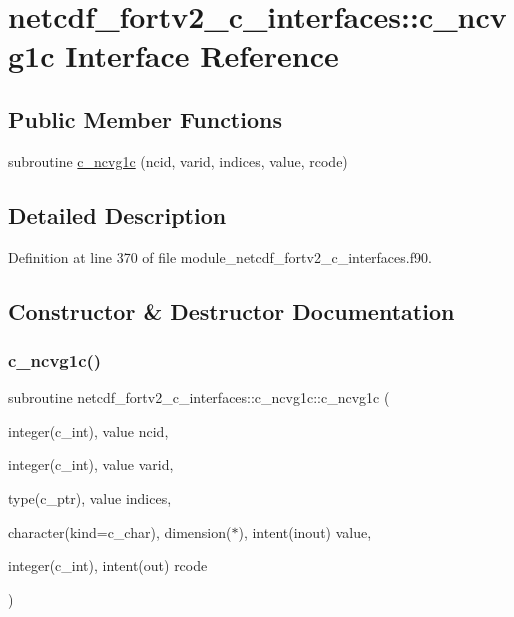 \hypertarget{interfacenetcdf__fortv2__c__interfaces_1_1c__ncvg1c}{}\section{netcdf\+\_\+fortv2\+\_\+c\+\_\+interfaces\+:\+:c\+\_\+ncvg1c Interface Reference}
\label{interfacenetcdf__fortv2__c__interfaces_1_1c__ncvg1c}
\subsection*{Public Member Functions}
\begin{DoxyCompactItemize}
\item 
subroutine \hyperlink{interfacenetcdf__fortv2__c__interfaces_1_1c__ncvg1c_a0cf3ef68cb01bf51a64efe10f68c14a7}{c\+\_\+ncvg1c} (ncid, varid, indices, value, rcode)
\end{DoxyCompactItemize}


\subsection{Detailed Description}


Definition at line 370 of file module\+\_\+netcdf\+\_\+fortv2\+\_\+c\+\_\+interfaces.\+f90.



\subsection{Constructor \& Destructor Documentation}
\mbox{\label{interfacenetcdf__fortv2__c__interfaces_1_1c__ncvg1c_a0cf3ef68cb01bf51a64efe10f68c14a7}} 
\subsubsection{\texorpdfstring{c\+\_\+ncvg1c()}{c\_ncvg1c()}}
{\footnotesize\ttfamily subroutine netcdf\+\_\+fortv2\+\_\+c\+\_\+interfaces\+::c\+\_\+ncvg1c\+::c\+\_\+ncvg1c (\begin{DoxyParamCaption}\item[{integer(c\+\_\+int), value}]{ncid,  }\item[{integer(c\+\_\+int), value}]{varid,  }\item[{type(c\+\_\+ptr), value}]{indices,  }\item[{character(kind=c\+\_\+char), dimension($\ast$), intent(inout)}]{value,  }\item[{integer(c\+\_\+int), intent(out)}]{rcode }\end{DoxyParamCaption})}



